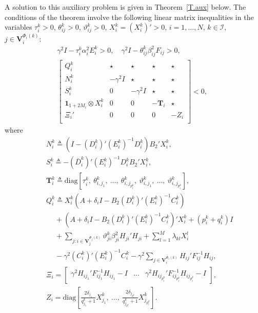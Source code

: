 \documentclass[a4paper,twocolumn]{autart}
\begin{document}
A solution to this auxiliary problem is
given in Theorem~\ref{T.aux} below.  The conditions of
the theorem involve the following linear matrix inequalities in the variables
$\tau_i^k>0$, $\theta_{ij}^k>0$, $\vartheta_{ij}^k>0$, $X_i^k=(X_i^k)'>0$,
$i=1,\ldots,N$, $k\in\mathcal{I}$, $j\in \mathbf{V}_i^{\Phi_i(k)}$:   
\begin{eqnarray}
  \label{T4.1}
&&\gamma^2I-\tau_i^k\alpha_i^2E_i^k>0, \quad \gamma^2I-\theta_{ij}^k\beta_{ij}^2
F_{ij}>0, \\
&&\left[
\begin{array}{ccccc}
Q_i^k & \star & \star & \star & \star \\
N_i^k & -\gamma^2I & \star &
\star & \star \\
S_i^k & 0 & -\gamma^2 I & \star & \star \\
\mathbf{1}_{1+2M_i} \otimes X_i^k & 0  & 0 & -\mathbf{T}_i & \star \\
\Xi_i' & 0  & 0 & 0 & -Z_i\\
\end{array}
\right]<0, \label{T4.LMI.1} \qquad 
\end{eqnarray}
where 
\begin{eqnarray*}
&&
N_i^k\triangleq
  \left(I-(D_i^k)'(E_i^k)^{-1}D_i^k\right)B_2'X_i^k, \\
&&
S_i^k\triangleq -(\bar D_i^k)'(E_i^k)^{-1}D_i^k B_2'X_i^k,\\
&& 
\mathbf{T}_i^k\triangleq \mathrm{diag}\left[\tau_i^k,~\theta_{i,j_1}^k,~\ldots,~\theta_{i,j_{p_i^k}}^k,
~\vartheta_{i,j_1}^k,~\ldots,~\vartheta_{i,j_{p_i^k}}^k\right], \\
&&
Q_i^k\triangleq X_i^k(A+\delta_iI-B_2(D_i^k)'(E_i^k)^{-1}C_i^k)\\
&&\phantom{Q_i^k}+(A+\delta_iI-
B_2(D_i^k)'(E_i^k)^{-1}C_i^k)'X_i^k  +(p_i^k+q_i^k)I \\
&& \phantom{Q_i^k}
+\sum_{j: i\in
  \mathbf{V}_j^{\Phi_j(k)}}\vartheta_{ji}^k\beta_{ji}^2H_{ji}'H_{ji}+\sum_{l=1}^M\lambda_{kl}X_i^l  \\
&& \phantom{Q_i^k}
-\gamma^2(C_i^k)'(E_i^k)^{-1}C_i^k- \gamma^2\sum_{j\in
  \mathbf{V}_i^{\Phi_i(k)}}H_{ij}'F_{ij}^{-1}H_{ij},\\
&&
\Xi_i\!=\!\left[\begin{array}{ccc}\gamma^2H_{ij_1}'F_{ij_1}^{-1}H_{ij_1}-I & \ldots & \gamma^2H_{ij_{p_i^k}}'F_{ij_{p_i^k}}^{-1}H_{ij_{p_i^k}}-I
  \end{array}
  \right]\!, \\
&&
Z_i=\mathrm{diag}\left[\frac{2\delta_{j_1}}{q_{j_1}^k+1} X_{j_1}^k,~\ldots,
  ~ \frac{2\delta_{j_{p_i^k}}}{q_{j_{p_i^k}}^k+1} X_{j_{p_i^k}}^k \right].
\end{eqnarray*}
\end{document}
